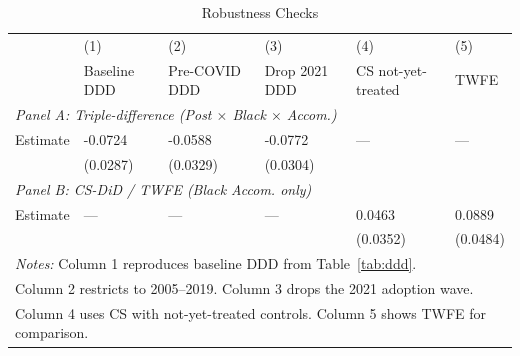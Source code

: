 \begin{table}[t]
\centering
\caption{Robustness Checks}
\label{tab:robust}
\begin{tabular}{lp{1.6cm}p{1.6cm}p{1.6cm}p{1.6cm}p{1.6cm}}
\hline\hline
 & (1) & (2) & (3) & (4) & (5) \\
 & Baseline DDD & Pre-COVID DDD & Drop 2021 DDD & CS not-yet-treated & TWFE \\
\hline
\multicolumn{6}{l}{\textit{Panel A: Triple-difference (Post $\times$ Black $\times$ Accom.)}} \\
Estimate & -0.0724 & -0.0588 & -0.0772 & --- & --- \\
 & (0.0287) & (0.0329) & (0.0304) & & \\
\multicolumn{6}{l}{\textit{Panel B: CS-DiD / TWFE (Black Accom. only)}} \\
Estimate & --- & --- & --- & 0.0463 & 0.0889 \\
 & & & & (0.0352) & (0.0484) \\
\hline
\multicolumn{6}{l}{\footnotesize \textit{Notes:} Column 1 reproduces baseline DDD from Table~\ref{tab:ddd}.} \\
\multicolumn{6}{l}{\footnotesize Column 2 restricts to 2005--2019. Column 3 drops the 2021 adoption wave.} \\
\multicolumn{6}{l}{\footnotesize Column 4 uses CS with not-yet-treated controls. Column 5 shows TWFE for comparison.} \\
\hline\hline
\end{tabular}
\end{table}


